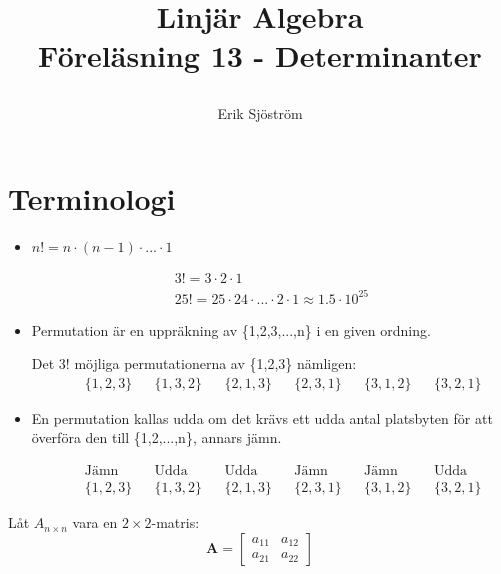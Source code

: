 
\usepackage{gauss}

\title{
	 Linjär Algebra\\
	 Föreläsning 13 - Determinanter
    \author{Erik Sjöström}
}

\maketitle
\section{Terminologi} %
\label{sec:terminologi}
\begin{itemize}
	\item $n! = n \cdot (n-1) \cdot ... \cdot 1$
	\begin{Ex}
	    \begin{gather*}
	    	3! = 3 \cdot 2 \cdot 1\\
	    	25! = 25 \cdot 24 \cdot ... \cdot 2 \cdot 1 \approx 1.5 \cdot 10^{25}
	    \end{gather*}
	\end{Ex}
	\item Permutation är en uppräkning av \{1,2,3,...,n\} i en given ordning.
	\begin{Ex}
	    Det $3!$ möjliga permutationerna av \{1,2,3\} nämligen:
	    \begin{align*}
	    &&\{1,2,3\}
	    &&\{1,3,2\}
	    &&\{2,1,3\}
	    &&\{2,3,1\}
	    &&\{3,1,2\}
	    &&\{3,2,1\}
	    \end{align*}
	\end{Ex}
	\item En permutation kallas udda om det krävs ett udda antal platsbyten för att överföra den till \{1,2,...,n\}, annars jämn.
	\begin{Ex}
	    \begin{align*}
	    &&\mbox{Jämn}
	    &&\mbox{Udda}
	    &&\mbox{Udda}
	    &&\mbox{Jämn}
	    &&\mbox{Jämn}
	    &&\mbox{Udda}
	    \\
	    &&\{1,2,3\}
	    &&\{1,3,2\}
	    &&\{2,1,3\}
	    &&\{2,3,1\}
	    &&\{3,1,2\}
	    &&\{3,2,1\}
	    \end{align*}
	\end{Ex}
\end{itemize}
Låt $A_{n \times n}$ vara en $2 \times 2$-matris:
\[
    \mathbf{A} = \begin{bmatrix} a_{11}&a_{12}\\a_{21}&a_{22} \end{bmatrix}
\]
